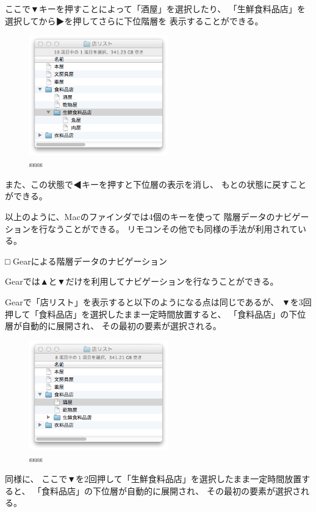 \documentclass[twoside]{wiss}
\begin{document}
ここで▼キーを押すことによって「酒屋」を選択したり、
「生鮮食料品店」を選択してから▶を押してさらに下位階層を
表示することができる。

\begin{figure}[H]
\centerline{\includegraphics[width=60mm,bb=0 0 344 298]{figures/ce3ee682612de44d6c663a7323c262a6.png}}
\caption{ssss}
\label{screenshot}
\end{figure}

また、この状態で◀キーを押すと下位層の表示を消し、
もとの状態に戻すことができる。

以上のように、Macのファインダでは4個のキーを使って
階層データのナビゲーションを行なうことができる。
リモコンその他でも同様の手法が利用されている。

□ Gearによる階層データのナビゲーション

Gearでは▲と▼だけを利用してナビゲーションを行なうことができる。

Gearで「店リスト」を表示すると以下のようになる点は同じであるが、
▼を3回押して「食料品店」を選択したまま一定時間放置すると、
「食料品店」の下位層が自動的に展開され、
その最初の要素が選択される。

\begin{figure}[H]
\centerline{\includegraphics[width=60mm,bb=0 0 344 272]{figures/2387e402f81dbe7917e04df82b0a659c.png}}
\caption{ssss}
\label{screenshot}
\end{figure}

同様に、 ここで▼を2回押して「生鮮食料品店」を選択したまま一定時間放置すると、
「食料品店」の下位層が自動的に展開され、
その最初の要素が選択される。
\end{document}
